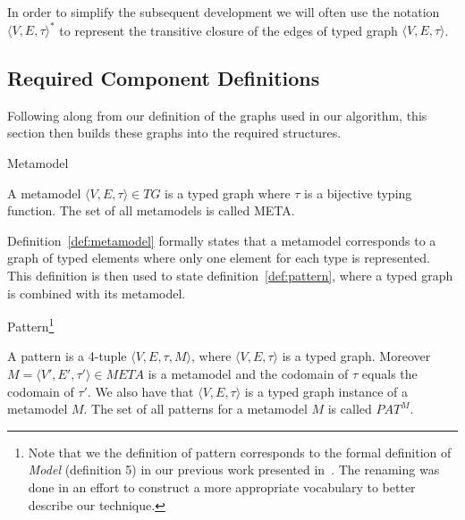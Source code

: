 In order to simplify the subsequent development we will often
use the notation ${\langle V,E,\tau\rangle}^*$ to represent the transitive
closure of the edges of typed graph  $\langle V,E,\tau\rangle$.

\subsection{Required Component Definitions}

Following along from our definition of the graphs used in our algorithm, this section then builds these graphs into the required structures.

\begin{definition}{Metamodel}
\label{def:metamodel}

A metamodel $\langle V,E,\tau\rangle\in TG$ is a typed graph where $\tau$ is a bijective typing function. The set of all metamodels is called META.

\end{definition}

Definition~\ref{def:metamodel} formally states that a metamodel corresponds to a graph of typed elements where only one element for each type is represented. This definition is then used to state definition~\ref{def:pattern}, where a typed graph is combined with its metamodel.

\begin{definition}{Pattern\footnote{Note that we the definition of pattern corresponds to the formal definition of \emph{Model} (definition 5) in our previous work presented in~\cite{Lucio:10}. The renaming was done in an effort to construct a more appropriate vocabulary to better describe our technique.}}
\label{def:pattern}

A pattern is a 4-tuple $\langle V,E,\tau,M\rangle$, where $\langle
V,E,\tau\rangle$ is a typed graph. Moreover $M=\langle V',E',\tau'\rangle\in
META$ is a metamodel and the codomain of $\tau$ equals the codomain of $\tau'$.
We also have that $\langle V,E,\tau\rangle$ is a typed graph instance of a
metamodel $M$. The set of all patterns for a metamodel $M$ is called $PAT^{M}$.
\end{definition}


